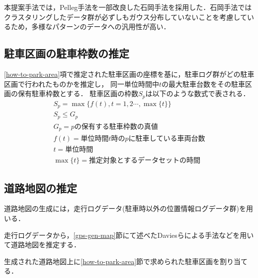 本提案手法では，Pelleg手法を一部改良した石岡手法\cite{Ishioka}を採用した．石岡手法ではクラスタリングしたデータ群が必ずしもガウス分布していないことを考慮しているため，多様なパターンのデータへの汎用性が高い．





\subsection{駐車区画の駐車枠数の推定}
\label{how-to-park-slot}
\ref{how-to-park-area}項で推定された駐車区画の座標を基に，駐車ログ群がどの駐車区画で行われたものかを推定し，
同一単位時間中$t$の最大駐車台数をその駐車区画の保有駐車枠数とする．
駐車区画の枠数$S_p$は以下のような数式で表される．
\begin{align}
	S_p = \max \{ f(t),t = 1,2 \cdots,\max\{t\} \}       \\
	S_p \leq G_p										\\
	G_p = pの保有する駐車枠数の真値\\
	f(t) = 単位時間t時のpに駐車している車両台数                   \\
	t = 単位時間                                     \\
	\max\{t\} = 推定対象とするデータセットの時間 
\end{align}

\subsection{道路地図の推定}
道路地図の生成には，走行ログデータ(駐車時以外の位置情報ログデータ群)を用いる．

走行ログデータから，\ref{gps-gen-map}節にて述べたDaviesらによる手法\cite{Davies}などを用いて道路地図を推定する．

生成された道路地図上に\ref{how-to-park-area}節で求められた駐車区画を割り当てる．


